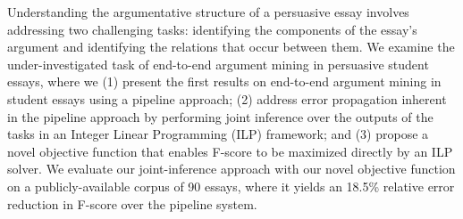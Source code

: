 Understanding the argumentative structure of a persuasive essay involves addressing two challenging tasks: identifying the components of the essay's argument and identifying the relations that occur between them. We examine the under-investigated task of end-to-end argument mining in persuasive student essays, where we (1) present the first results on end-to-end argument mining in student essays using a pipeline approach; (2) address error propagation inherent in the pipeline approach by performing joint inference over the outputs of the tasks in an Integer Linear Programming (ILP) framework; and (3) propose a novel objective function that enables F-score to be maximized directly by an ILP solver. We evaluate our joint-inference approach with our novel objective function on a publicly-available corpus of 90 essays, where it yields an 18.5\% relative error reduction in F-score over the pipeline system.
